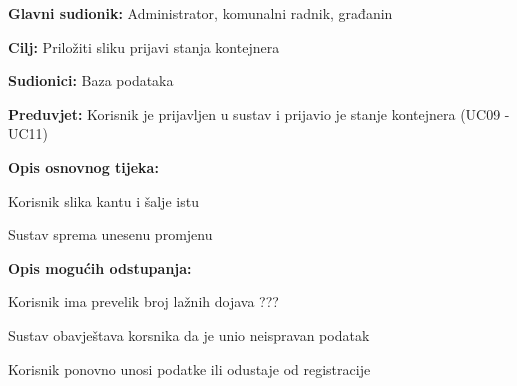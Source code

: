				\noindent {}
					\begin{packed_item}
	
						\item \textbf{Glavni sudionik: }Administrator, komunalni radnik, građanin
						\item  \textbf{Cilj:} Priložiti sliku prijavi stanja kontejnera
						\item  \textbf{Sudionici:} Baza podataka
						\item  \textbf{Preduvjet:} Korisnik je prijavljen u sustav i prijavio je stanje kontejnera (UC09 - UC11)
						\item  \textbf{Opis osnovnog tijeka:}
						
						\item[] \begin{packed_enum}
	
							\item Korisnik slika kantu i šalje istu
							\item Sustav sprema unesenu promjenu
						\end{packed_enum}
						
						\item  \textbf{Opis mogućih odstupanja:}
						
						\item[] \begin{packed_item}
	
							\item[2.a] Korisnik ima prevelik broj lažnih dojava ???
							
							\item[] \begin{packed_enum}
								
								\item Sustav obavještava korsnika da je unio neispravan podatak
								\item Korisnik ponovno unosi podatke ili odustaje od registracije
								
							
							\end{packed_enum}
							
						\end{packed_item}
					\end{packed_item}


				
				
